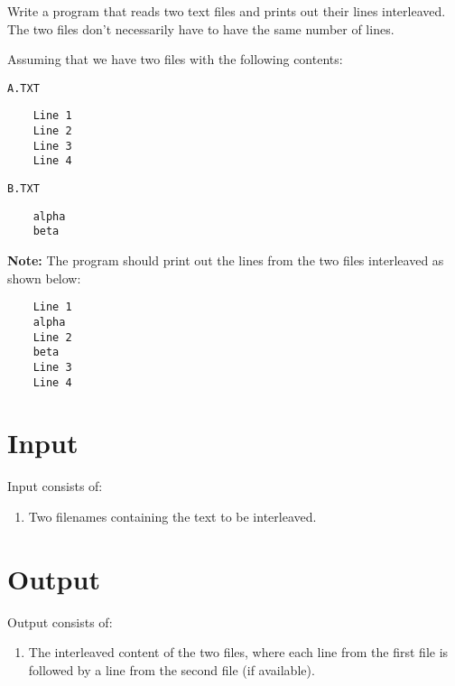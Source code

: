 
Write a program that reads two text files and prints out their lines interleaved. The two files don't necessarily have to have the same number of lines.

Assuming that we have two files with the following contents:

\texttt{A.TXT}
\begin{verbatim}
    Line 1
    Line 2
    Line 3
    Line 4
\end{verbatim}

\texttt{B.TXT}
\begin{verbatim}
    alpha
    beta
\end{verbatim}

\textbf{Note:} The program should print out the lines from the two files interleaved as shown below:

\begin{verbatim}
    Line 1
    alpha
    Line 2
    beta
    Line 3
    Line 4
\end{verbatim}

\section*{Input}
Input consists of:
\begin{enumerate}
    \item Two filenames containing the text to be interleaved.
\end{enumerate}

\section*{Output}
Output consists of:
\begin{enumerate}
    \item The interleaved content of the two files, where each line from the first file is followed by a line from the second file (if available).
\end{enumerate}
